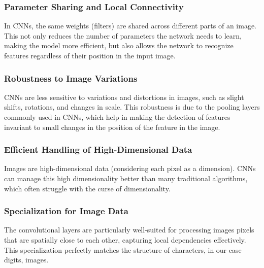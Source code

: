 \documentclass[utf8,1pt]{extarticle} %
\begin{document}
\subsubsection{Parameter Sharing and Local Connectivity}
In CNNs, the same weights (filters) are shared across
different parts of an image. 
This not only reduces the number of parameters the network
needs to learn, making the model more efficient, 
but also allows the network to recognize features
regardless of their position in the input image.

\subsubsection{Robustness to Image Variations}
CNNs are less sensitive to variations and distortions 
in images, such as slight shifts, rotations, 
and changes in scale. 
This robustness is due to the pooling layers commonly used
in CNNs, which help in making the detection of features
invariant to small changes in the position of the feature
in the image.

\subsubsection{Efficient Handling of High-Dimensional Data}
Images are high-dimensional data 
(considering each pixel as a dimension). 
CNNs can manage this high dimensionality better 
than many traditional algorithms, 
which often struggle with the curse of dimensionality.

\subsubsection{Specialization for Image Data}
The convolutional layers are particularly well-suited 
for processing images pixels that are spatially close 
to each other, capturing local dependencies effectively.
This specialization perfectly matches the structure of 
characters, in our case digits, images.
\end{document}
